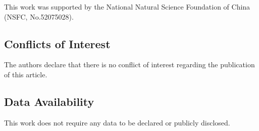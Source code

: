 \documentclass{article}
\begin{document}
This work was supported by the National Natural Science Foundation of China (NSFC, No.52075028).

\subsection*{Conflicts of Interest}

The authors declare that there is no conflict of interest regarding the publication of this article.

\subsection*{Data Availability}

This work does not require any data to be declared or publicly disclosed.

% 
% 

\printbibliography
\end{document}
